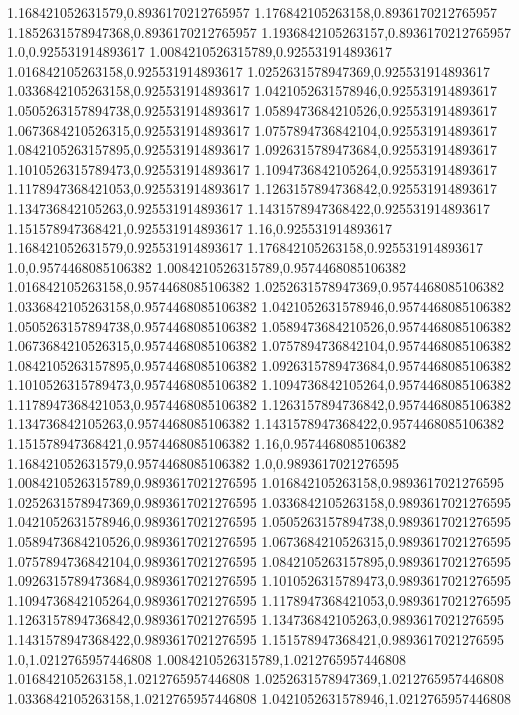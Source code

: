 1.168421052631579,0.8936170212765957
1.176842105263158,0.8936170212765957
1.1852631578947368,0.8936170212765957
1.1936842105263157,0.8936170212765957
1.0,0.925531914893617
1.0084210526315789,0.925531914893617
1.016842105263158,0.925531914893617
1.0252631578947369,0.925531914893617
1.0336842105263158,0.925531914893617
1.0421052631578946,0.925531914893617
1.0505263157894738,0.925531914893617
1.0589473684210526,0.925531914893617
1.0673684210526315,0.925531914893617
1.0757894736842104,0.925531914893617
1.0842105263157895,0.925531914893617
1.0926315789473684,0.925531914893617
1.1010526315789473,0.925531914893617
1.1094736842105264,0.925531914893617
1.1178947368421053,0.925531914893617
1.1263157894736842,0.925531914893617
1.134736842105263,0.925531914893617
1.1431578947368422,0.925531914893617
1.151578947368421,0.925531914893617
1.16,0.925531914893617
1.168421052631579,0.925531914893617
1.176842105263158,0.925531914893617
1.0,0.9574468085106382
1.0084210526315789,0.9574468085106382
1.016842105263158,0.9574468085106382
1.0252631578947369,0.9574468085106382
1.0336842105263158,0.9574468085106382
1.0421052631578946,0.9574468085106382
1.0505263157894738,0.9574468085106382
1.0589473684210526,0.9574468085106382
1.0673684210526315,0.9574468085106382
1.0757894736842104,0.9574468085106382
1.0842105263157895,0.9574468085106382
1.0926315789473684,0.9574468085106382
1.1010526315789473,0.9574468085106382
1.1094736842105264,0.9574468085106382
1.1178947368421053,0.9574468085106382
1.1263157894736842,0.9574468085106382
1.134736842105263,0.9574468085106382
1.1431578947368422,0.9574468085106382
1.151578947368421,0.9574468085106382
1.16,0.9574468085106382
1.168421052631579,0.9574468085106382
1.0,0.9893617021276595
1.0084210526315789,0.9893617021276595
1.016842105263158,0.9893617021276595
1.0252631578947369,0.9893617021276595
1.0336842105263158,0.9893617021276595
1.0421052631578946,0.9893617021276595
1.0505263157894738,0.9893617021276595
1.0589473684210526,0.9893617021276595
1.0673684210526315,0.9893617021276595
1.0757894736842104,0.9893617021276595
1.0842105263157895,0.9893617021276595
1.0926315789473684,0.9893617021276595
1.1010526315789473,0.9893617021276595
1.1094736842105264,0.9893617021276595
1.1178947368421053,0.9893617021276595
1.1263157894736842,0.9893617021276595
1.134736842105263,0.9893617021276595
1.1431578947368422,0.9893617021276595
1.151578947368421,0.9893617021276595
1.0,1.0212765957446808
1.0084210526315789,1.0212765957446808
1.016842105263158,1.0212765957446808
1.0252631578947369,1.0212765957446808
1.0336842105263158,1.0212765957446808
1.0421052631578946,1.0212765957446808
